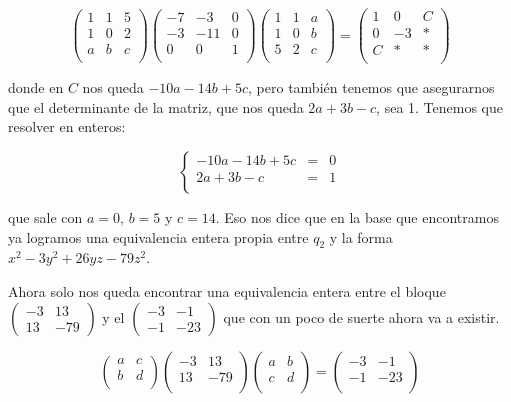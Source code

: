 \documentclass[12pt]{amsart}
\newcommand{\minimat}[4]{\left(\begin{smallmatrix} #1 & #2 \\ #3 & #4 
\end{smallmatrix}\right)}
\newcommand{\lp}{\left(}
\newcommand{\rp}{\right)}
\theoremstyle{plain}
\begin{document}
$$\lp\begin{matrix}
    1&1&5 \\
    1&0&2 \\
    a&b&c \\
\end{matrix}\rp
\lp\begin{matrix}
    -7&-3&0 \\
    -3&-11&0 \\
    0&0&1 \\
\end{matrix}\rp
\lp\begin{matrix}
    1&1&a \\
    1&0&b \\
    5&2&c \\
\end{matrix}\rp = 
\lp\begin{matrix}
    1&0&C\\
    0&-3&* \\
    C&*&* \\
\end{matrix}\rp$$

donde en $C$ nos queda $-10a-14b+5c$, pero también tenemos 
que asegurarnos que el determinante de la matriz, que nos 
queda $2a+3b-c$, sea 1. Tenemos que resolver en enteros:

$$\left\{
\begin{matrix}
    -10a-14b+5c &=&0 \\
    2a+3b-c &=&1 \\
\end{matrix}\right.$$

que sale con $a=0$, $b=5$ y $c=14$. Eso nos dice que en la 
base que encontramos ya logramos una equivalencia entera 
propia entre $q_2$ y la forma $x^2-3y^2+26yz-79z^2$.

Ahora solo nos queda encontrar una equivalencia entera
entre el bloque $\minimat{-3}{13}{13}{-79}$ y el $\minimat
{-3}{-1}{-1}{-23}$ que con un poco de suerte ahora va a existir.

$$\lp\begin{matrix}
    a&c \\
    b&d \\
\end{matrix}\rp
\lp\begin{matrix}
    -3&13 \\
    13&-79 \\
\end{matrix}\rp
\lp\begin{matrix}
    a&b \\
    c&d \\
\end{matrix}\rp = 
\lp\begin{matrix}
    -3&-1\\
    -1&-23 \\
\end{matrix}\rp$$
\end{document}
